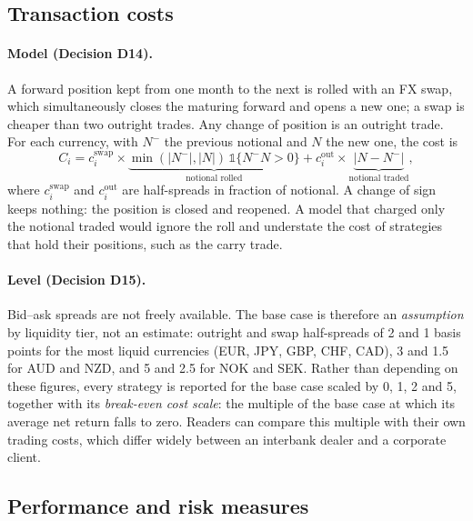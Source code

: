\subsection{Transaction costs}\label{sec:costs}

\paragraph{Model (Decision D14).}
A forward position kept from one month to the next is rolled with an FX swap, which simultaneously closes the maturing forward and opens a new one; a swap is cheaper than two outright trades.
Any change of position is an outright trade.
For each currency, with $N^{-}$ the previous notional and $N$ the new one, the cost is
\begin{equation}\label{eq:cost}
  C_i = c^{\mathrm{swap}}_i \times \underbrace{\min(|N^-|, |N|)\,\mathbb{1}\{N^- N > 0\}}_{\text{notional rolled}}
      + c^{\mathrm{out}}_i \times \underbrace{|N - N^-|}_{\text{notional traded}},
\end{equation}
where $c^{\mathrm{swap}}_i$ and $c^{\mathrm{out}}_i$ are half-spreads in fraction of notional.
A change of sign keeps nothing: the position is closed and reopened.
A model that charged only the notional traded would ignore the roll and understate the cost of strategies that hold their positions, such as the carry trade.

\paragraph{Level (Decision D15).}
Bid--ask spreads are not freely available.
The base case is therefore an \emph{assumption} by liquidity tier, not an estimate: outright and swap half-spreads of 2 and 1 basis points for the most liquid currencies (EUR, JPY, GBP, CHF, CAD), 3 and 1.5 for AUD and NZD, and 5 and 2.5 for NOK and SEK.
Rather than depending on these figures, every strategy is reported for the base case scaled by 0, 1, 2 and 5, together with its \emph{break-even cost scale}: the multiple of the base case at which its average net return falls to zero.
Readers can compare this multiple with their own trading costs, which differ widely between an interbank dealer and a corporate client.

\subsection{Performance and risk measures}\label{sec:metrics}


